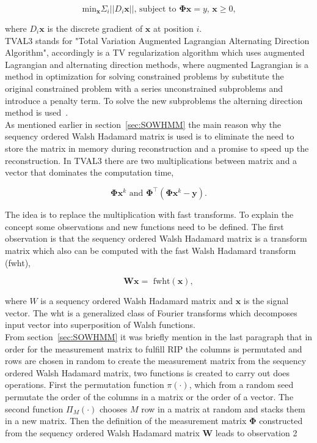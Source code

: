 \begin{equation}
\text{min}_\mathbf{x} \Sigma_i ||D_i \mathbf{x} || \text{, subject to } \mathbf{\Phi x} = 	y \text{, } \mathbf{x} \geq 0 \text{,} 
\end{equation}

where $D_i\mathbf{x}$ is the discrete gradient of $\mathbf{x}$ at position $i$.\\[0.1in]

TVAL3 stands for "Total Variation Augmented Lagrangian Alternating Direction Algorithm", accordingly is a TV regularization algorithm which uses augmented Lagrangian and alternating direction methods, where augmented Lagrangian is a method in optimization for solving constrained problems by substitute the original constrained problem with a series unconstrained subproblems and introduce a penalty term. To solve the new subproblems the alterning direction method is used~\cite{article:TVAL3}.\\[0.1in]

As mentioned earlier in section~\ref{sec:SOWHMM} the main reason why the sequency ordered Walsh Hadamard matrix is used is to eliminate the need to store the matrix in memory during reconstruction and a promise to speed up the reconstruction. In TVAL3 there are two multiplications between matrix and a vector that dominates the computation time,

\begin{equation}
\mathbf{\Phi}\mathbf{x}^k \text{ and } \mathbf{\Phi}^\top(\mathbf{\Phi}\mathbf{x}^k-\mathbf{y})\text{.}
\end{equation}

The idea is to replace the multiplication with fast transforms. To explain the concept some observations and new functions need to be defined. The first observation is that the sequency ordered Walsh Hadamard matrix is a transform matrix which also can be computed with the fast Walsh Hadamard transform (fwht),

\begin{equation}
\mathbf{W}\mathbf{x} = \text{ fwht}(\mathbf{x}),
\end{equation}

where $W$ is a sequency ordered Walsh Hadamard matrix and $\mathbf{x}$ is the signal vector. The wht is a generalized class of Fourier transforms which decomposes input vector into superposition of Walsh functions.\\[0.1in]

From section~\ref{sec:SOWHMM} it was briefly mention in the last paragraph that in order for the measurement matrix to fulfill RIP the columns is permutated and rows are chosen in random to create the measurement matrix from the sequency ordered Walsh Hadamard matrix, two functions is created to carry out does operations. First the permutation function $\pi(\cdot)$, which from a random seed permutate the order of the columns in a matrix or the order of a vector. The second function $\Pi_M(\cdot)$ chooses $M$ row in a matrix at random and stacks them in a new matrix. Then the definition of the measurement matrix $\mathbf{\Phi}$ constructed from the sequency ordered Walsh Hadamard matrix $\mathbf{W}$ leads to observation 2

